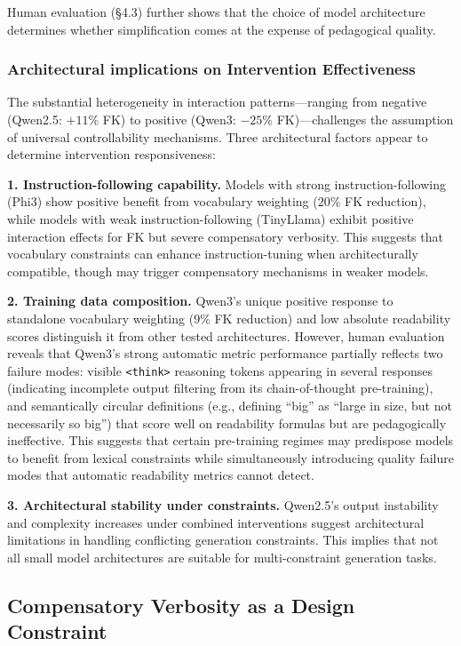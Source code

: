 \documentclass[10pt, a4paper]{article}
\let\oldtexttt\texttt
\renewcommand{\texttt}[1]{{\small\oldtexttt{#1}}}
\begin{document}
Human evaluation (§4.3) further shows that the choice of model architecture determines whether simplification comes at the expense of pedagogical quality.

\subsubsection{Architectural implications on Intervention Effectiveness}

The substantial heterogeneity in interaction patterns—ranging from negative (Qwen2.5: $+11\%$ FK) to positive (Qwen3: $-25\%$ FK)—challenges the assumption of universal controllability mechanisms. Three architectural factors appear to determine intervention responsiveness:

\textbf{1. Instruction-following capability.} Models with strong instruction-following (Phi3) show positive benefit from vocabulary weighting ($20\%$ FK reduction), while models with weak instruction-following (TinyLlama) exhibit positive interaction effects for FK but severe compensatory verbosity. This suggests that vocabulary constraints can enhance instruction-tuning when architecturally compatible, though may trigger compensatory mechanisms in weaker models.

\textbf{2. Training data composition.} Qwen3's unique positive response to standalone vocabulary weighting ($9\%$ FK reduction) and low absolute readability scores distinguish it from other tested architectures. However, human evaluation reveals that Qwen3's strong automatic metric performance partially reflects two failure modes: visible \texttt{<think>} reasoning tokens appearing in several responses (indicating incomplete output filtering from its chain-of-thought pre-training), and semantically circular definitions (e.g., defining ``big'' as ``large in size, but not necessarily so big'') that score well on readability formulas but are pedagogically ineffective. This suggests that certain pre-training regimes may predispose models to benefit from lexical constraints while simultaneously introducing quality failure modes that automatic readability metrics cannot detect.

\textbf{3. Architectural stability under constraints.} Qwen2.5's output instability and complexity increases under combined interventions suggest architectural limitations in handling conflicting generation constraints. This implies that not all small model architectures are suitable for multi-constraint generation tasks.

\subsection{Compensatory Verbosity as a Design Constraint}
\end{document}
